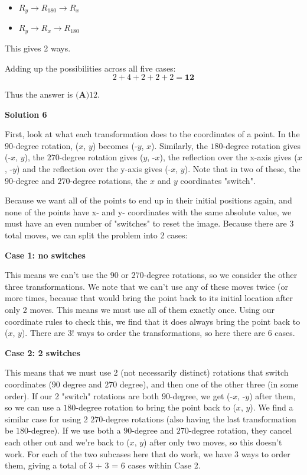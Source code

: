 \begin{enumerate}
 
            \begin{itemize}
        \item $R_y \to R_{180} \to R_x$
        \item $R_y \to R_x \to R_{180}$
            \end{itemize}
            This gives 2 ways.

 Adding up the possibilities across all five cases:
 \[2 + 4 + 2 + 2 + 2 = \mathbf{12}\]

 Thus the answer is $\boxed{\textbf{(A)} 12}$.

 



\textbf{Solution 6}

First, look at what each transformation does to the coordinates of a point. In the $90$-degree rotation, ($x$, $y$) becomes (-$y$, $x$). Similarly, the $180$-degree rotation gives (-$x$, $y$), the $270$-degree rotation gives ($y$, -$x$), the reflection over the x-axis gives ($x$, -$y$) and the reflection over the y-axis gives (-$x$, $y$). Note that in two of these, the $90$-degree and $270$-degree rotations, the $x$ and $y$ coordinates "switch".

 Because we want all of the points to end up in their initial positions again, and none of the points have x- and y- coordinates with the same absolute value, we must have an even number of "switches" to reset the image. Because there are 3 total moves, we can split the problem into 2 cases:

 \textbf{Case 1: no switches}

 This means we can't use the $90$ or $270$-degree rotations, so we consider the other three transformations. We note that we can't use any of these moves twice (or more times, because that would bring the point back to its initial location after only 2 moves. This means we must use all of them exactly once. Using our coordinate rules to check this, we find that it does always bring the point back to ($x$, $y$). There are 3! ways to order the transformations, so here there are 6 cases.

 \textbf{Case 2: 2 switches}

 This means that we must use 2 (not necessarily distinct) rotations that switch coordinates ($90$ degree and $270$ degree), and then one of the other three (in some order). If our 2 "switch" rotations are both $90$-degree, we get (-$x$, -$y$) after them, so we can use a $180$-degree rotation to bring the point back to ($x$, $y$). We find a similar case for using 2 $270$-degree rotations (also having the last transformation be $180$-degree). If we use both a $90$-degree and $270$-degree rotation, they cancel each other out and we're back to ($x$, $y$) after only two moves, so this doesn't work. For each of the two subcases here that do work, we have 3 ways to order them, giving a total of 3 + 3 = 6 cases within Case 2.


\end{enumerate}
